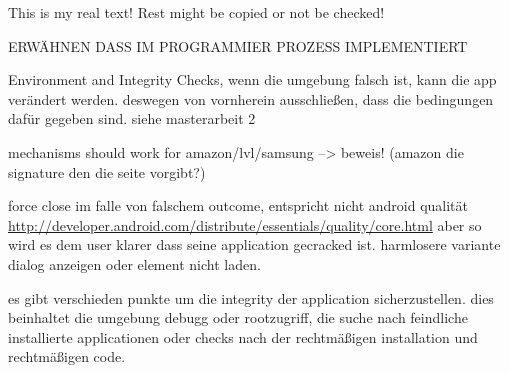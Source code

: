 This is my real text! Rest might be copied or not be checked!

ERWÄHNEN DASS IM PROGRAMMIER PROZESS  IMPLEMENTIERT\newline

Environment and Integrity Checks, wenn die umgebung falsch ist, kann die app verändert werden. deswegen von vornherein ausschließen, dass die bedingungen dafür gegeben sind.\newline
siehe masterarbeit 2\newline

mechanisms should work for amazon/lvl/samsung --> beweis! (amazon die signature den die seite vorgibt?)\newline

force close im falle von falschem outcome, entspricht nicht android qualität
\url{http://developer.android.com/distribute/essentials/quality/core.html} aber so wird es dem user klarer dass seine application gecracked ist. harmlosere variante dialog anzeigen oder element nicht laden.

es gibt verschieden punkte um die integrity der application sicherzustellen. dies beinhaltet die umgebung debugg oder rootzugriff, die suche nach feindliche installierte applicationen oder checks nach der rechtmäßigen installation und rechtmäßigen code.\newline

